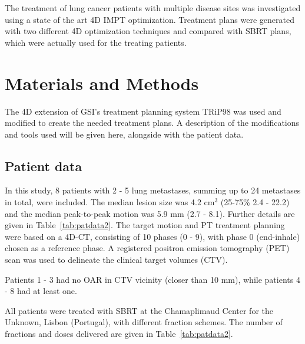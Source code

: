 The treatment of lung cancer patients  with multiple disease sites was investigated using a state of the art 4D IMPT optimization. 
Treatment plans were generated with two different 4D optimization techniques and compared with SBRT plans, which were actually used for the treating patients.


\newpage
\section{Materials and Methods}

The 4D extension of GSI's treatment planning system TRiP98 \cite{Kraemer2000a, Richter2013} was used and modified to create the needed treatment plans. A description of the modifications and tools used will be given here, 
alongside with the patient data.

\subsection{Patient data}


In this study, 8 patients with 2 - 5 lung metastases, summing up to 24 metastases in total, were included. The median lesion size was 4.2 cm$^3$ (25-75\% 2.4 - 22.2) and the median peak-to-peak motion was 5.9 mm (2.7 - 8.1). 
Further details are given in Table~\ref{tab:patdata2}.
The target motion and PT treatment planning were based on a 4D-CT, consisting of 10 phases (0 - 9), with phase 0 (end-inhale) chosen as a reference phase.
A registered positron emission tomography (PET) scan was used to delineate the clinical target volumes (CTV). 

Patients 1 - 3 had no OAR in CTV vicinity (closer than 10 mm), while patients 4 - 8 had at least one.

All patients were treated with SBRT at the Chamaplimaud Center for the Unknown, Lisbon (Portugal), with different fraction schemes. 
The number of fractions and doses delivered are given in Table~\ref{tab:patdata2}.

\newpage


